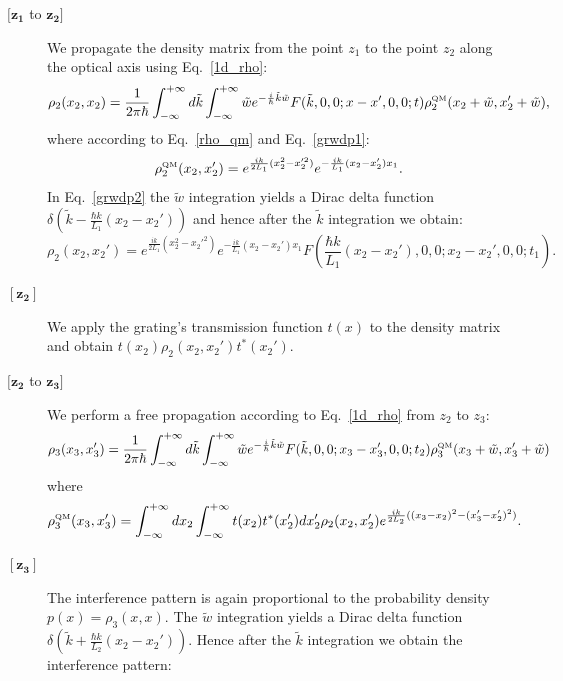 \documentclass[12pt,groupedaddress,pra,aps]{revtex4-1}
\begin{document}
\begin{description}
\item[$\boldsymbol{[z_1}$ to $\boldsymbol{z_2]}$] We propagate the density matrix from the point $z_1$ to the point $z_2$ along the optical axis using Eq.~\eqref{1d_rho}:
\begin{equation}\label{grwdp2}
\rho_2(x_2,x_2)=\frac{1}{2\pi\hbar} \int_{-\infty}^{+\infty} d\tilde{k}  \int_{-\infty}^{+\infty} \tilde{w} e^{-\frac{i}{\hbar}\tilde{k} \tilde{w}} 
 F(\tilde{k},0,0;x-x',0,0;t) \rho_2^{\text{\tiny QM}}(x_2+\tilde{w},x_2'+\tilde{w}),
\end{equation}
where according to Eq.~\eqref{rho_qm} and Eq.~\eqref{grwdp1}:
\begin{equation}
\rho_2^{\text{\tiny QM}}(x_2,x_2')=e^{\frac{ik}{2L_1}(x_2^2-x_2'^2)}e^{-\frac{ik}{L_1}(x_2-x_2')x_1}.
\end{equation}
In Eq.~\eqref{grwdp2} the $\tilde{w}$ integration yields a Dirac delta function  $\delta(\tilde{k}-\frac{\hbar k}{L_1}(x_2-x_2'))$ and hence after the $\tilde{k}$ integration we obtain:
\begin{equation}
\rho_2(x_2,x_2')= e^{\frac{ik}{2L_1}(x_2^2-x_2'^2)}e^{-\frac{ik}{L_1}(x_2-x_2')x_1}F\left(\frac{\hbar k}{L_1}(x_2-x_2'),0,0;x_2-x_2',0,0;t_1\right).
\end{equation}
\item[$\boldsymbol{[z_2]}$] We  apply the grating's transmission function $t(x)$ to the density matrix and obtain $t(x_2) \rho_2(x_2,x_2') t^*(x_2')$.
\item[$\boldsymbol{[z_2}$ to $\boldsymbol{z_3]}$] 
We  perform a free propagation according to Eq.~\eqref{1d_rho} from $z_2$ to $z_3$:
\begin{equation}\label{grwdp3}
\rho_3(x_3,x_3')=\frac{1}{2\pi\hbar} \int_{-\infty}^{+\infty} d\tilde{k}  \int_{-\infty}^{+\infty} \tilde{w} e^{-\frac{i}{\hbar}\tilde{k} \tilde{w}}  F(\tilde{k},0,0;x_3-x'_3,0,0;t_2) \rho_3^{\text{\tiny QM}}(x_3+\tilde{w},x_3'+\tilde{w})
\end{equation}
where 
\begin{equation}
\rho_3^{\text{\tiny QM}}(x_3,x_3')= \int_{-\infty}^{+\infty} dx_2\int_{-\infty}^{+\infty}  t(x_2) t^*(x_2') dx_2' \rho_2(x_2,x_2') e^{\frac{ik}{2L_2}((x_3-x_2)^2-(x_3'-x_2')^2)}.
\end{equation}
\item[$\boldsymbol{[z_3]}$] 
The interference pattern is again proportional to the probability density $p(x)=\rho_3(x,x)$. The $\tilde{w}$ integration yields a Dirac delta function  $\delta(\tilde{k}+\frac{\hbar k}{L_2}(x_2-x_2'))$. Hence after the $\tilde{k}$ integration we obtain the interference pattern:

\end{description}
\end{document}
